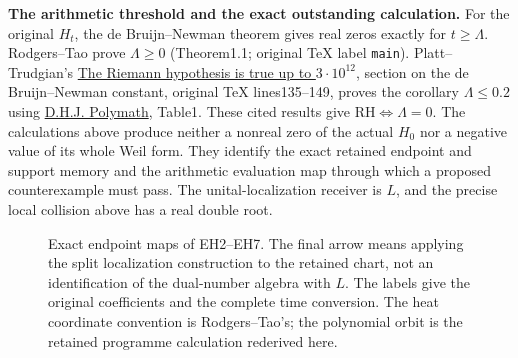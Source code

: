 \EH\textbf{The arithmetic threshold and the exact outstanding calculation.}
For the original $H_t$, the de Bruijn--Newman theorem gives real zeros
exactly for $t\ge\Lambda$. Rodgers--Tao prove $\Lambda\ge0$
(Theorem1.1; original TeX label \texttt{main}). Platt--Trudgian's
\href{https://arxiv.org/abs/2004.09765}{The Riemann hypothesis is true up
to $3\cdot10^{12}$}, section on the de Bruijn--Newman constant, original
TeX lines135--149, proves the corollary $\Lambda\le0.2$ using
\href{https://arxiv.org/abs/1904.12438}{D.H.J. Polymath}, Table1.
These cited results give $\mathrm{RH}\iff\Lambda=0$.
The calculations above produce neither a nonreal zero of the actual
$H_0$ nor a negative value of its whole Weil form. They identify the
exact retained endpoint and support memory and the arithmetic
evaluation map through which a proposed counterexample must pass.
The unital-localization receiver is $L$, and the precise local collision
above has a real double root.

\begin{figure}[p]
\centering
{}
\caption{Exact endpoint maps of EH2--EH7. The final arrow means applying
the split localization construction to the retained chart, not an
identification of the dual-number algebra with $L$. The labels give the
original coefficients and the complete time conversion. The heat
coordinate convention is Rodgers--Tao's; the polynomial orbit is the
retained programme calculation rederived here.}
\end{figure}
